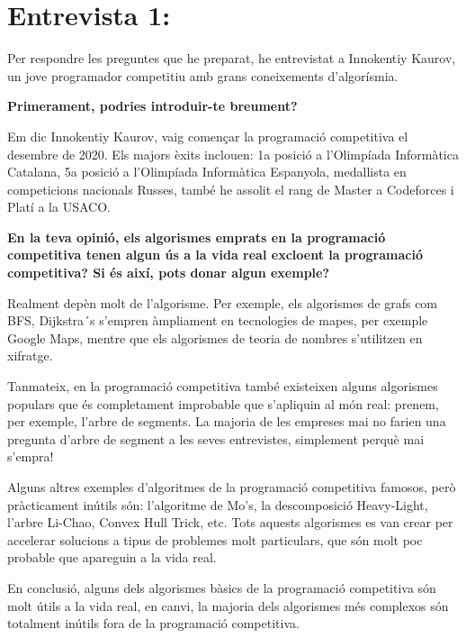 \section{Entrevista 1:}

Per respondre les preguntes que he preparat, he entrevistat a Innokentiy Kaurov, un jove programador competitiu amb grans coneixements d'algorísmia. \newline

\textbf{Primerament, podries introduir-te breument?} \newline

Em dic Innokentiy Kaurov, vaig començar la programació competitiva el desembre de 2020. Els majors èxits inclouen: 1a posició a l'Olimpíada Informàtica Catalana, 5a posició a l'Olimpíada Informàtica Espanyola, medallista en competicions nacionals Russes, també he assolit el rang de Master a Codeforces i Platí a la USACO. \newline

\textbf{En la teva opinió, els algorismes emprats en la programació competitiva tenen algun ús a la vida real excloent la programació competitiva? Si és així, pots donar algun exemple?} \newline

Realment depèn molt de l'algorisme. Per exemple, els algorismes de grafs com BFS, Dijkstra´s s'empren àmpliament en tecnologies de mapes, per exemple Google Maps, mentre que els algorismes de teoria de nombres s'utilitzen en xifratge.

Tanmateix, en la programació competitiva també existeixen alguns algorismes populars que és completament improbable que s'apliquin al món real: prenem, per exemple, l'arbre de segments. La majoria de les empreses mai no farien una pregunta d'arbre de segment a les seves entrevistes, simplement perquè mai s'empra!

Alguns altres exemples d'algoritmes de la programació competitiva famosos, però pràcticament inútils són: l'algoritme de Mo's, la descomposició Heavy-Light, l'arbre Li-Chao, Convex Hull Trick, etc. Tots aquests algorismes es van crear per accelerar solucions a tipus de problemes molt particulars, que són molt poc probable que apareguin a la vida real.

En conclusió, alguns dels algorismes bàsics de la programació competitiva són molt útils a la vida real, en canvi, la majoria dels algorismes més complexos són totalment inútils fora de la programació competitiva.
\newline

